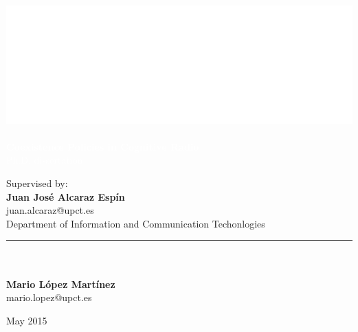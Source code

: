 \graphicspath{ {img/} }

\makeatletter                   
\def\printauthor{%
    {\large \@author}}          
\makeatother

\author{%

    }
\begin{titlingpage}
\BgThispage
{}
\vspace*{0.25\textheight}
\noindent
\includegraphics{logo.eps}\\\\ 
\textcolor{white}{\Huge\textbf{{Coexistence Policies in Cognitive Radio}}}\vspace*{0.25cm}\\
\noindent
\hspace*{1cm}\textcolor{white}{\normalsize{Ph.D. dissertation}}
\vspace*{3cm}\par
\noindent
\hspace*{3.5cm}
\begin{minipage}{0.35\linewidth}
    \begin{flushright}
    Supervised by:\\
    \textbf{Juan Jos\'e Alcaraz Esp\'in}\\
    juan.alcaraz@upct.es\vspace*{1cm}\\
    Department of Information and Communication Techonlogies\\
    \end{flushright}
\end{minipage} \hspace{15pt}
%
\begin{minipage}{0.02\linewidth}
    \rule{1pt}{175pt}
\end{minipage} \hspace{0pt}
%
\begin{minipage}{0.63\linewidth}
\vspace{9pt}
    ~\\
    ~\\
    \normalsize\textbf{Mario L\'{o}pez Mart\'{i}nez} \\
    \normalsize{mario.lopez@upct.es}\\
\end{minipage}
\vfill
\hspace{0.52\linewidth}May 2015
\end{titlingpage}
\restoregeometry